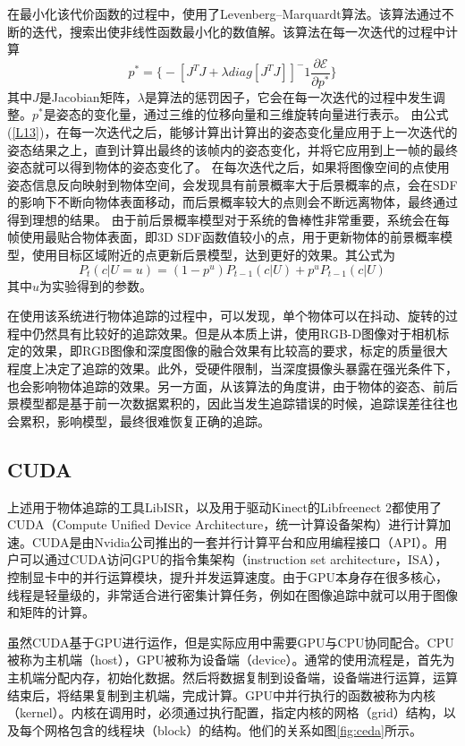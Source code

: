 在最小化该代价函数的过程中，使用了Levenberg–Marquardt算法。该算法通过不断的迭代，搜索出使非线性函数最小化的数值解。该算法在每一次迭代的过程中计算
\begin{equation}\label{L13}
p^*=\Big\{-[J^TJ + \lambda diag[J^TJ]]^-1\frac{\partial\mathscr{E}}{\partial p^*}\Big\}
\end{equation}
其中$J$是Jacobian矩阵，$\lambda$是算法的惩罚因子，它会在每一次迭代的过程中发生调整。$p^*$是姿态的变化量，通过三维的位移向量和三维旋转向量进行表示。
由公式(\ref{L13})，在每一次迭代之后，能够计算出计算出的姿态变化量应用于上一次迭代的姿态结果之上，直到计算出最终的该帧内的姿态变化，并将它应用到上一帧的最终姿态就可以得到物体的姿态变化了。
在每次迭代之后，如果将图像空间的点使用姿态信息反向映射到物体空间，会发现具有前景概率大于后景概率的点，会在SDF的影响下不断向物体表面移动，而后景概率较大的点则会不断远离物体，最终通过得到理想的结果。
由于前后景概率模型对于系统的鲁棒性非常重要，系统会在每帧使用最贴合物体表面，即3D SDF函数值较小的点，用于更新物体的前景概率模型，使用目标区域附近的点更新后景模型，达到更好的效果。其公式为
\begin{equation}
P_t(c|U=u)=(1-p^u)P_{t-1}(c|U) + p^uP_{t-1}(c|U)
\end{equation}
其中$u$为实验得到的参数。

在使用该系统进行物体追踪的过程中，可以发现，单个物体可以在抖动、旋转的过程中仍然具有比较好的追踪效果。但是从本质上讲，使用RGB-D图像对于相机标定的效果，即RGB图像和深度图像的融合效果有比较高的要求，标定的质量很大程度上决定了追踪的效果。此外，受硬件限制，当深度摄像头暴露在强光条件下，也会影响物体追踪的效果。另一方面，从该算法的角度讲，由于物体的姿态、前后景模型都是基于前一次数据累积的，因此当发生追踪错误的时候，追踪误差往往也会累积，影响模型，最终很难恢复正确的追踪。

\subsection{CUDA}
上述用于物体追踪的工具LibISR，以及用于驱动Kinect的Libfreenect 2都使用了CUDA\cite{CUDARef}（Compute Unified Device Architecture，统一计算设备架构）进行计算加速。CUDA是由Nvidia公司推出的一套并行计算平台和应用编程接口（API）。用户可以通过CUDA访问GPU的指令集架构（instruction set architecture，ISA），控制显卡中的并行运算模块，提升并发运算速度。由于GPU本身存在很多核心，线程是轻量级的，非常适合进行密集计算任务，例如在图像追踪中就可以用于图像和矩阵的计算。

虽然CUDA基于GPU进行运作，但是实际应用中需要GPU与CPU协同配合。CPU被称为主机端（host），GPU被称为设备端（device）。通常的使用流程是，首先为主机端分配内存，初始化数据。然后将数据复制到设备端，设备端进行运算，运算结束后，将结果复制到主机端，完成计算。GPU中并行执行的函数被称为内核（kernel）。内核在调用时，必须通过执行配置，指定内核的网格（grid）结构，以及每个网格包含的线程块（block）的结构。他们的关系如图\ref{fig:ceda}所示。

